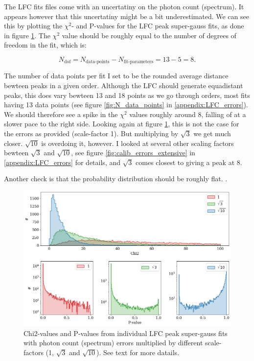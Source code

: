     The LFC fits files come with an uncertatiny on the photon count (spectrum). It appears however that this uncertatiny might be a bit underestimated. We can see this by plotting the $\chi^2$- and P-values for the LFC peak super-gauss fits, as done in figure \ref{fig:calib_errors}. The $\chi^2$ value should be roughly equal to the number of degrees of freedom in the fit, which is: 

    \begin{equation}
        \label{eq:ndof}
        N_\text{dof} = N_\text{data-points} - N_\text{fit-parameters} =  13 - 5 = 8.
    \end{equation}

    The number of data points per fit I set to be the rounded average distance bewteen peaks in a given order. Although the LFC should generate equadistant peaks, this does vary bewteen 13 and 18 points as we go through orders, most fits having 13 data points (see figure \ref{fig:N_data_points} in \ref{appendix:LFC_errors}). We should therefore see a spike in the $\chi^2$ values roughly around 8, falling of at a slower pace to the right side. Looking again at figure \ref{fig:calib_errors}, this is not the case for the errors as provided (scale-factor 1). But multiplying by $\sqrt{3}$ we get much closer. $\sqrt{10}$ is overdoing it, however. I looked at several other scaling factors bewteen $\sqrt{3}$ and $\sqrt{10}$, see figure \ref{fig:calib_errors_extensive} in \ref{appendix:LFC_errors} for details, and $\sqrt{3}$ comes closest to giving a peak at 8.
    
    Another check is that the probability distribution should be roughly flat. .
    
    \begin{figure}[ht]
        \centering
        \includegraphics[scale=0.40]{figures/calib_errors.png}
        \caption{Chi2-values and P-values from individual LFC peak super-gauss fits with photon count (spectrum) errors multiplied by different scale-factors (1, $\sqrt{3}$ and $\sqrt{10}$). See text for more datails.}
        \label{fig:calib_errors}
    \end{figure}

